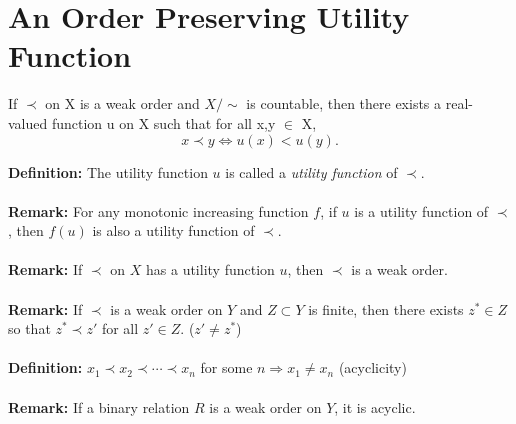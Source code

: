 \documentclass[10pt,a4paper,oneside]{article}
\begin{document}
\section{An Order Preserving Utility Function}
\begin{Thm}
	If $\prec$ on X is a weak order and $X/\sim$ is countable, then there exists a real-valued function u on X such that for all x,y $\in$ X, $$x \prec y \Leftrightarrow u(x) < u(y).$$
	\end{Thm}
{\bf Definition:} The utility function $u$ is called a \emph{utility function} of $\prec$.\\ \\
{\bf Remark:} For any monotonic increasing function $f$, if $u$ is a utility function of $\prec$, then $f(u)$ is also a utility function of $\prec$.\\ \\
{\bf Remark:} If $\prec$ on $X$ has a utility function $u$, then $\prec$ is a weak order.\\ \\
{\bf Remark:} If $\prec$ is a weak order on $Y$ and $Z \subset Y$ is finite, then there exists $z^* \in Z$ so that $z^* \prec z'$ for all $z' \in Z$. ($z' \neq z^*$)\\ \\
{\bf Definition:} $x_1 \prec x_2 \prec \cdots \prec x_n$ for some $n \Rightarrow x_1 \neq x_n$ (acyclicity)\\ \\
{\bf Remark:} If a binary relation $R$ is a weak order on $Y$, it is acyclic. 
\end{document}
